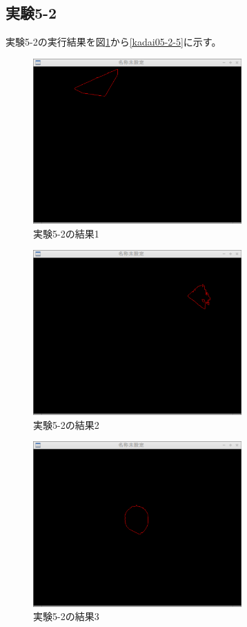 \documentclass{jarticle}[2012/05/15]
\begin{document}
\subsection{実験5-2}
実験5-2の実行結果を図\ref{kadai05-2-1}から\ref{kadai05-2-5}に示す。\par
\begin{figure}[htbp]
  \centering
  \includegraphics[width=8cm]{kadai05-2-1.eps}
  \caption{実験5-2の結果1} \label{kadai05-2-1}
\end{figure}
\begin{figure}[htbp]
  \centering
  \includegraphics[width=8cm]{kadai05-2-2.eps}
  \caption{実験5-2の結果2} \label{kadai05-2-2}
\end{figure}
\begin{figure}[htbp]
  \centering
  \includegraphics[width=8cm]{kadai05-2-3.eps}
  \caption{実験5-2の結果3} \label{kadai05-2-3}
\end{figure}
\end{document}
